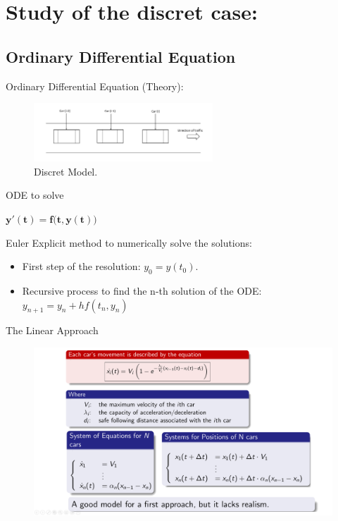 \documentclass{beamer}
\begin{document}
\section{Study of the discret case:}
\subsection{Ordinary Differential Equation}
\begin{frame}{Ordinary Differential Equation (Theory):}

\begin{figure}
    \centering
    \includegraphics[width=0.6\textwidth]{discret.png} 
    \caption{ Discret Model.}
\end{figure}
\vspace{-0.7cm}
\begin{block}{ODE to solve}
	\begin{center}
		$\boxed{\mathbf{y'(t) = f{\bigl (}t, y(t){\bigr )}}}$
	\end{center}
	Euler Explicit method to numerically solve the solutions:
	\begin{itemize}
		\item First step of the resolution: $\boxed{y_0 = y(t_0)}$.
		\item Recursive process to find the n-th solution of the ODE: $\boxed{y_{n+1} = y_{n} + hf(t_{n}, y_{n})}$
	\end{itemize}
\end{block}


    
\end{frame}


\begin{frame}{The Linear Approach}
	\begin{figure}
		\includegraphics[width=1.0\textwidth]{test.png}
	\end{figure}
\end{frame}
\end{document}
